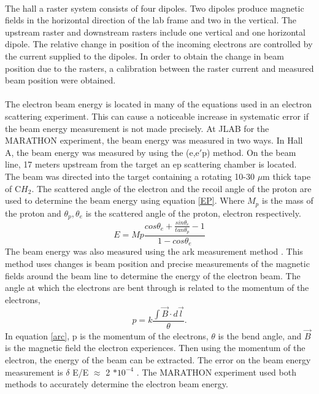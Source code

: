 	 \paragraph{} The hall a raster system consists of four dipoles. Two dipoles produce magnetic fields in the horizontal direction of the lab frame and two in the vertical. The upstream raster and downstream rasters include one vertical and one horizontal dipole. The relative change in position of the incoming electrons are controlled by the current supplied to the dipoles. In order to obtain the change in beam position due to the rasters, a calibration between the raster current and measured beam position were obtained.  
	 
	 \paragraph{}The electron beam energy is located in many of the equations used in an electron scattering experiment. This can cause a noticeable increase in systematic error if the beam energy measurement is not made precisely. At JLAB for the MARATHON experiment, the beam energy was measured in two ways. In Hall A, the beam energy was measured by using the (e,e$\prime$p) method. On the beam line, 17 meters upstream from the target an ep scattering chamber is located. The beam was directed into the target containing a rotating 10-30 $\mu$m thick tape of C$H_2$. The scattered angle of the electron and the recoil angle of the proton are used to determine the beam energy using equation \ref{EP}. Where $M_p$ is the mass of the proton and $\theta_p, \theta_e$ is the scattered angle of the proton, electron respectively. 
	\begin{equation}
	\label{EP}
	E = Mp \frac{cos\theta_e + \frac{sin\theta_e}{tan\theta_p}-1}{1 - cos\theta_e} 
	\end{equation}
	The beam energy was also measured using the ark measurement method \cite{Flay}. This method uses changes is beam position and precise measurements of the magnetic fields around the beam line to determine the energy of the electron beam. The angle at which the electrons are bent through is related to the momentum of the electrons,
	\begin{equation}
	\label{arc}
	p = k \frac{\int \vec{B} \cdot d\vec{l}}{\theta}.
	\end{equation}	
	In equation \ref{arc}, p is the momentum of the electrons, $\theta$ is the bend angle, and $\vec{B}$ is the magnetic field the electron experiences. Then using the momentum of the electron, the energy of the beam can be extracted. The error on the beam energy measurement is $\delta$ E/E $\approx$ 2 $* 10^{-4} $ \cite{EPMet, Flay}.  The MARATHON experiment used both methods to accurately determine the electron beam energy.  
